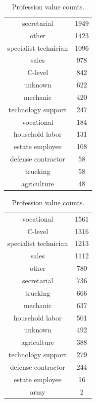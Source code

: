 \begin{table}[!h]
    \caption{Profession value counts.}
    \label{tab:profession}

    \begin{subtable}[ht]{.5\textwidth}
        \centering
        \begin{tabular}{cc}
            secretarial & 1949 \\
            other & 1423 \\
            specialist technician & 1096 \\
            sales & 978 \\
            C-level & 842 \\
            unknown & 622 \\
            mechanic & 420 \\
            technology support & 247 \\
            vocational & 184 \\
            household labor & 131 \\
            estate employee & 108 \\
            defense contractor & 58 \\
            trucking & 58 \\
            agriculture & 48 \\
        \end{tabular}
    \end{subtable}
    \begin{subtable}[ht]{.5\textwidth}
        \centering
        \begin{tabular}{cc}
            vocational & 1561 \\
            C-level & 1316 \\
            specialist technician & 1213 \\
            sales & 1112 \\
            other & 780 \\
            secretarial & 736 \\
            trucking & 666 \\
            mechanic & 637 \\
            household labor & 501 \\
            unknown & 492 \\
            agriculture & 388 \\
            technology support & 279 \\
            defense contractor & 244 \\
            estate employee & 16 \\
            army & 2 \\
        \end{tabular}
    \end{subtable}


\end{table}
